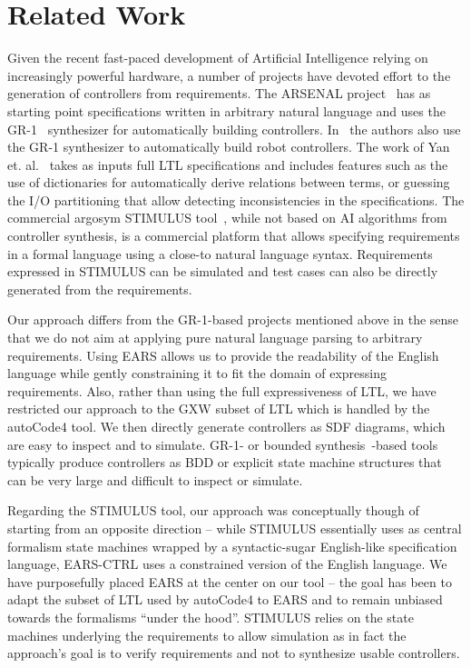 \section{Related Work}
\vspace{-.2cm}Given the recent fast-paced development of Artificial Intelligence
relying on increasingly powerful hardware, a number of projects have devoted
effort to the generation of controllers from requirements. The ARSENAL
project~\cite{ghosh2016arsenal} has as starting point specifications written in
arbitrary natural language and uses the GR-1~\cite{piterman2006synthesis}
synthesizer for automatically building controllers. In~\cite{kress2008translating} the
authors also use the GR-1 synthesizer to automatically build robot
controllers. The work of Yan et. al.~\cite{YanCC15} takes as inputs full LTL
specifications and includes features such as the use of dictionaries for
automatically derive relations between terms, or guessing the I/O partitioning
that allow detecting inconsistencies in the specifications. The commercial
argosym STIMULUS tool~\cite{jeannet16}, while not based on AI algorithms from controller
synthesis, is a commercial platform that allows specifying requirements in a 
formal language using a close-to natural language syntax. Requirements expressed
in STIMULUS can be simulated and test cases can also be directly generated from
the requirements.

Our approach differs from the GR-1-based projects mentioned above in the sense
that we do not aim at applying pure natural language parsing to arbitrary
requirements. Using EARS allows us to provide the readability of the English
language while gently constraining it to fit the domain of expressing
requirements. Also, rather than using the full expressiveness of LTL, we have
restricted our approach to the \textsf{GXW} subset of LTL which is handled by
the \textsf{autoCode4} tool. We then directly generate controllers as SDF
diagrams, which are easy to inspect and to simulate. GR-1- or bounded
synthesis~\cite{schewe2007bounded}-based tools typically produce controllers as
BDD or explicit state machine structures that can be very large and difficult to inspect or simulate.

Regarding the STIMULUS tool, our approach was conceptually though of starting
from an opposite direction -- while STIMULUS essentially uses as central
formalism state machines wrapped by a syntactic-sugar English-like specification
language, \textsf{EARS-CTRL} uses a constrained version of the English language.
We have purposefully placed EARS at the center on our tool -- the goal has been
to adapt the subset of LTL used by \textsf{autoCode4} to EARS and to remain
unbiased towards the formalisms ``under the hood''. STIMULUS relies on the state
machines underlying the requirements to allow simulation as in fact the
approach's goal is to verify requirements and not to synthesize usable
controllers.\vspace{-.3cm}

